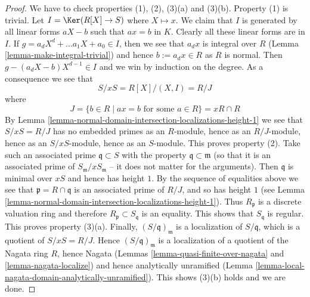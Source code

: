 \begin{proof}
\medskip\noindent
We have to check properties (1), (2), (3)(a) and (3)(b).
Property (1) is trivial.
Let $I = \Ker(R[X] \to S)$ where $X \mapsto x$.
We claim that $I$ is generated by all linear forms $aX - b$ such that
$ax = b$ in $K$. Clearly all these linear forms are in $I$.
If $g = a_d X^d + \ldots a_1 X + a_0 \in I$, then we see that
$a_dx$ is integral over $R$ (Lemma \ref{lemma-make-integral-trivial})
and hence $b := a_dx \in R$
as $R$ is normal. Then $g - (a_dX - b)X^{d - 1} \in I$ and we win by
induction on the degree. As a consequence we see that
$$
S/xS = R[X]/(X, I) = R/J
$$
where
$$
J = \{b \in R \mid ax = b \text{ for some }a \in R\} = xR \cap R
$$
By Lemma \ref{lemma-normal-domain-intersection-localizations-height-1}
we see that $S/xS = R/J$ has no embedded primes as an $R$-module, hence as
an $R/J$-module, hence as an $S/xS$-module, hence as an $S$-module.
This proves property (2).
Take such an associated prime $\mathfrak q \subset S$ with the
property $\mathfrak q \subset \mathfrak m$ (so that it is an
associated prime of $S_{\mathfrak m}/xS_{\mathfrak m}$ -- it does not
matter for the arguments).
Then $\mathfrak q$ is minimal over $xS$ and hence has height $1$.
By the sequence of equalities above we see that
$\mathfrak p = R \cap \mathfrak q$ is an associated
prime of $R/J$, and so has height $1$
(see Lemma \ref{lemma-normal-domain-intersection-localizations-height-1}).
Thus $R_{\mathfrak p}$ is a discrete valuation ring and therefore
$R_{\mathfrak p} \subset S_{\mathfrak q}$ is an equality. This shows
that $S_{\mathfrak q}$ is regular. This proves property (3)(a).
Finally, $(S/\mathfrak q)_{\mathfrak m}$ is a localization
of $S/\mathfrak q$, which is a quotient of $S/xS = R/J$.
Hence $(S/\mathfrak q)_{\mathfrak m}$ is a localization of
a quotient of the Nagata ring $R$, hence
Nagata (Lemmas \ref{lemma-quasi-finite-over-nagata}
and \ref{lemma-nagata-localize})
and hence analytically unramified
(Lemma \ref{lemma-local-nagata-domain-analytically-unramified}).
This shows (3)(b) holds and we are done.
\end{proof}
